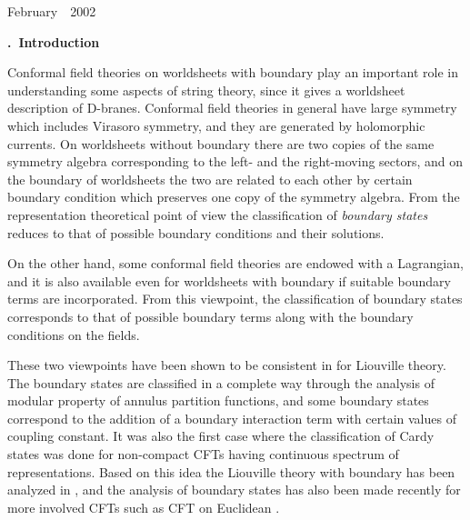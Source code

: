 \documentclass[a4paper,12pt]{article}
\def\section#1{
    \addtocounter{section}{1}\setcounter{subsection}{0}\setcounter{equation}{0}
    \vskip8mm\begin{center}{\bf\thesection~#1}\end{center}}
\begin{document}
\vspace*{\fill}
\noindent February~~2002
\setcounter{page}{0}
\newpage


\setcounter{footnote}{0}
\setcounter{section}{0}
\pagestyle{plain}
\renewcommand{\thesection}{\arabic{section}.}
\renewcommand{\thesubsection}{\arabic{section}.\arabic{subsection}.}
\renewcommand{\theequation}{\arabic{section}.\arabic{equation}}
\renewcommand{\thefootnote}{\arabic{footnote}}
\setcounter{footnote}{0}


\section{Introduction}%

   Conformal field theories on worldsheets with boundary 
 play an important role in understanding some aspects of
 string theory, since it gives a worldsheet description
 of D-branes.
 Conformal field theories in general have large symmetry
 which includes Virasoro symmetry, and they are generated by
 holomorphic currents.
 On worldsheets without boundary there are two copies of the same
 symmetry algebra corresponding to the left- and the right-moving
 sectors, and on the boundary of worldsheets the two are related to
 each other by certain boundary condition which preserves one
 copy of the symmetry algebra.
 From the representation theoretical point of view the classification
 of {\it boundary states} reduces to that of possible boundary
 conditions and their solutions.

   On the other hand, some conformal field theories are endowed
 with a Lagrangian, and it is also available even for worldsheets with
 boundary if suitable boundary terms are incorporated.
 From this viewpoint, the classification of boundary states
 corresponds to that of possible boundary terms along with the
 boundary conditions on the fields.

   These two viewpoints have been shown to be consistent in
 \cite{FZZ,ZZ} for Liouville theory.
 The boundary states are classified in a complete way through
 the analysis of modular property of annulus partition functions,
 and some boundary states correspond to the addition of a
 boundary interaction term with certain values of coupling constant.
 It was also the first case where the classification of Cardy states
 was done for non-compact CFTs having continuous spectrum of
 representations.
 Based on this idea the Liouville theory with boundary has been
 analyzed in \cite{H,PT}, and the analysis of boundary states has
 also been made recently for more involved CFTs such as CFT
 on Euclidean \coordHE{}\cite{GKS,PS,LOP,PST}.
\end{document}
